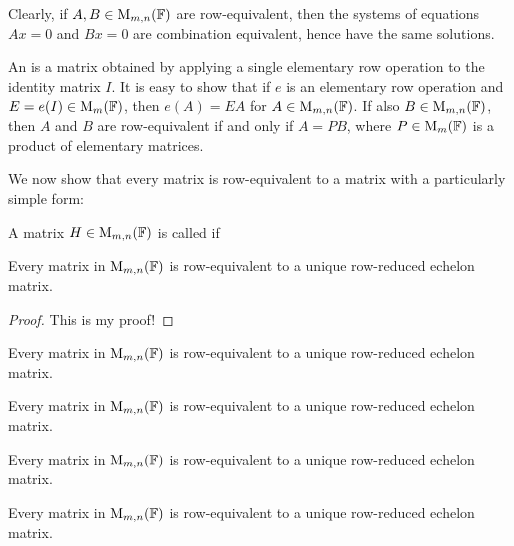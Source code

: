 Clearly, if $A, B \in \mathrm{M}_{m,n}(\mathbb{F})$ are row-equivalent, then the systems of equations $Ax = 0$ and $Bx = 0$ are combination equivalent, hence have the same solutions.

An  is a matrix obtained by applying a single elementary row operation to the identity matrix $I$. It is easy to show that if $e$ is an elementary row operation and $E = e(I) \in \mathrm{M}_{m}(\mathbb{F})$, then $e(A) = EA$ for $A \in \mathrm{M}_{m,n}(\mathbb{F})$. If also $B \in \mathrm{M}_{m,n}(\mathbb{F})$, then $A$ and $B$ are row-equivalent if and only if $A = PB$, where $P \in \mathrm{M}_{m}(\mathbb{F})$ is a product of elementary matrices.

We now show that every matrix is row-equivalent to a matrix with a particularly simple form:

\begin{definition}
    A matrix $H \in \mathrm{M}_{m,n}(\mathbb{F})$ is called  if
\end{definition}

\begin{proposition}[My proposition]
    Every matrix in $\mathrm{M}_{m,n}(\mathbb{F})$ is row-equivalent to a unique row-reduced echelon matrix.
\end{proposition}

\begin{proof}
    This is my proof!
\end{proof}

\begin{lemma}
    Every matrix in $\mathrm{M}_{m,n}(\mathbb{F})$ is row-equivalent to a unique row-reduced echelon matrix.
\end{lemma}

\begin{corollary}
    Every matrix in $\mathrm{M}_{m,n}(\mathbb{F})$ is row-equivalent to a unique row-reduced echelon matrix.
\end{corollary}

\begin{example}
    Every matrix in $\mathrm{M}_{m,n}(\mathbb{F})$ is row-equivalent to a unique row-reduced echelon matrix.
\end{example}

\begin{remark}
    Every matrix in $\mathrm{M}_{m,n}(\mathbb{F})$ is row-equivalent to a unique row-reduced echelon matrix.
\end{remark}